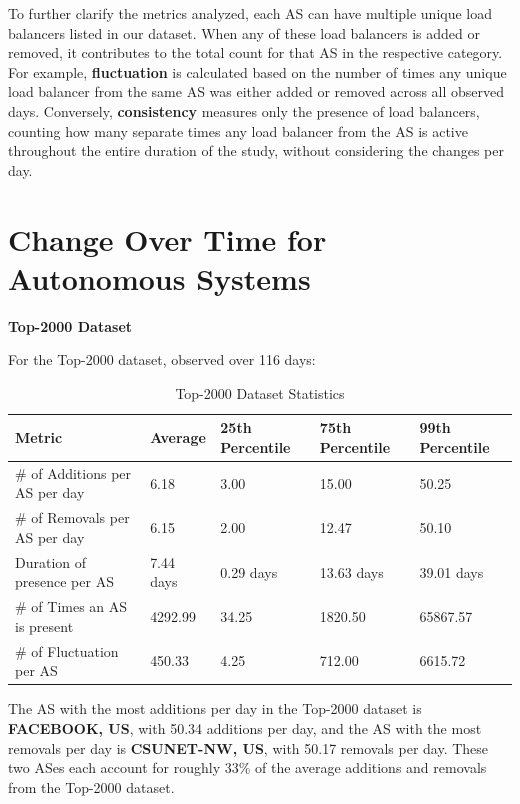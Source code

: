 \documentclass[12pt]{cwru_thesis}
\begin{document}
To further clarify the metrics analyzed, each AS can have multiple unique load balancers listed in our dataset. When any of these load balancers is added or removed, it contributes to the total count for that AS in the respective category. For example, \textbf{fluctuation} is calculated based on the number of times any unique load balancer from the same AS was either added or removed across all observed days. Conversely, \textbf{consistency} measures only the presence of load balancers, counting how many separate times any load balancer from the AS is active throughout the entire duration of the study, without considering the changes per day.



\section{Change Over Time for Autonomous Systems}

\textbf{Top-2000 Dataset}

For the Top-2000 dataset, observed over 116 days:

\begin{table}[h!]
    \centering
    \begin{tabular}{|l|l|l|l|l|}
        \hline
        \textbf{Metric} & \textbf{Average} & \textbf{25th Percentile} & \textbf{75th Percentile} & \textbf{99th Percentile} \\
        \hline
        \# of Additions per AS per day & 6.18 & 3.00 & 15.00 & 50.25 \\
        \hline
        \# of Removals per AS per day & 6.15 & 2.00 & 12.47 & 50.10 \\
        \hline
        Duration of presence per AS & 7.44 days & 0.29 days & 13.63 days & 39.01 days \\
        \hline
        \# of Times an AS is present & 4292.99 & 34.25 & 1820.50 & 65867.57 \\
        \hline
        \# of Fluctuation per AS & 450.33 & 4.25 & 712.00 & 6615.72 \\
        \hline
    \end{tabular}
    \caption{Top-2000 Dataset Statistics}
    \label{tab:top-2000-stats}
\end{table}

The AS with the most additions per day in the Top-2000 dataset is \textbf{FACEBOOK, US}, with 50.34 additions per day, and the AS with the most removals per day is \textbf{CSUNET-NW, US}, with 50.17 removals per day. These two ASes each account for roughly 33\% of the average additions and removals from the Top-2000 dataset.
\end{document}
